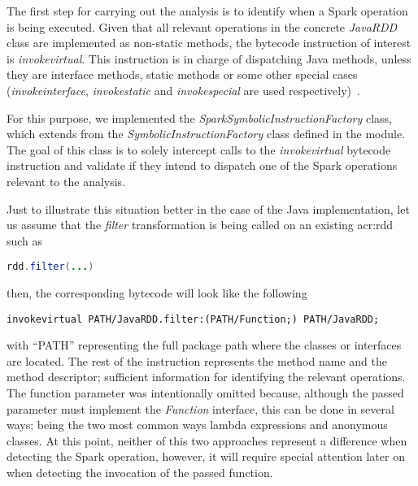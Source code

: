 



The first step for carrying out the analysis is to identify when a Spark operation is being executed. Given that all relevant operations in the concrete \textit{JavaRDD} class are implemented as non-static methods, the bytecode instruction of interest is \textit{invokevirtual}. This instruction is in charge of dispatching Java methods, unless they are interface methods, static methods or some other special cases (\textit{invokeinterface}, \textit{invokestatic} and \textit{invokespecial} are used respectively)~\cite{Lindholm2014}.

For this purpose, we implemented the \textit{SparkSymbolicInstructionFactory} class, which extends from the \textit{SymbolicInstructionFactory} class defined in the \spf{} module. The goal of this class is to solely intercept calls to the \textit{invokevirtual} bytecode instruction and validate if they intend to dispatch one of the Spark operations relevant to the analysis.

Just to illustrate this situation better in the case of the Java implementation, let us assume that the \textit{filter} transformation is being called on an existing \acrshort{acr:rdd} such as

\hspace*{1cm} \lstinline[language=Java,]|rdd.filter(...)|

then, the corresponding bytecode will look like the following

\hspace*{1cm} \lstinline[]|invokevirtual PATH/JavaRDD.filter:(PATH/Function;) PATH/JavaRDD;|

with ``PATH'' representing the full package path where the classes or interfaces are located. The rest of the instruction represents the method name and the method descriptor; sufficient information for identifying the relevant operations. The function parameter was intentionally omitted because, although the passed parameter must implement the \textit{Function} interface, this can be done in several ways; being the two most common ways lambda expressions and anonymous classes. At this point, neither of this two approaches represent a difference when detecting the Spark operation, however, it will require special attention later on when detecting the invocation of the passed function.

